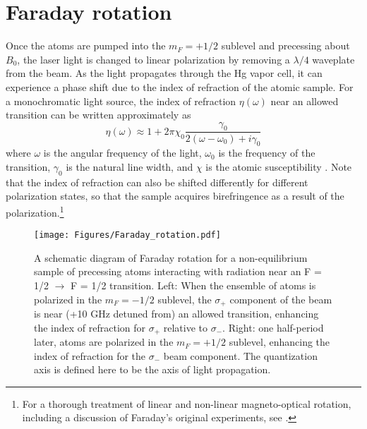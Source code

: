 \documentclass [10pt, twoside] {uwthesis}[2012/04/02]
\begin{document}
\section{Faraday rotation}
Once the atoms are pumped into the $m_F=+1/2$ sublevel and precessing about $B_0$, the laser light is changed to linear polarization by removing a $\lambda/4$ waveplate from the beam. As the light propagates through the Hg vapor cell, it can experience a phase shift due to the index of refraction of the atomic sample. For a monochromatic light source, the index of refraction $\eta(\omega)$ near an allowed transition can be written approximately as
\begin{equation} \label{eta}\eta(\omega) \approx 1 + 2\pi\chi_0\dfrac{\gamma_0}{2(\omega-\omega_0)+i\gamma_0}\end{equation}
where $\omega$ is the angular frequency of the light, $\omega_0$ is the frequency of the transition, $\gamma_0$ is the natural line width, and $\chi$ is the atomic susceptibility \cite{Kimball}. Note that the index of refraction can also be shifted differently for different polarization states, so that the sample acquires birefringence as a result of the polarization.\footnote{For a thorough treatment of linear and non-linear magneto-optical rotation, including a discussion of Faraday's original experiments, see \cite{Kimball}.} 

\begin{figure}
\begin{center}
\texttt{[image: Figures/Faraday\_rotation.pdf]}
\end{center}
\caption[Faraday rotation of polarized atoms]%
{\narrower A schematic diagram of Faraday rotation for a non-equilibrium sample of precessing atoms interacting with radiation near an F = 1/2 $\rightarrow$ F = 1/2 transition. Left: When the ensemble of atoms is polarized in the $m_F=-1/2$ sublevel, the $\sigma_+$ component of the beam is near (+10 GHz detuned from) an allowed transition, enhancing the index of refraction for $\sigma_+$ relative to $\sigma_-$. Right: one half-period later, atoms are polarized in the $m_F=+1/2$ sublevel, enhancing the index of refraction for the $\sigma_-$ beam component. The quantization axis is defined here to be the axis of light propagation.}
\label{FaradRot}
\end{figure}
\end{document}
